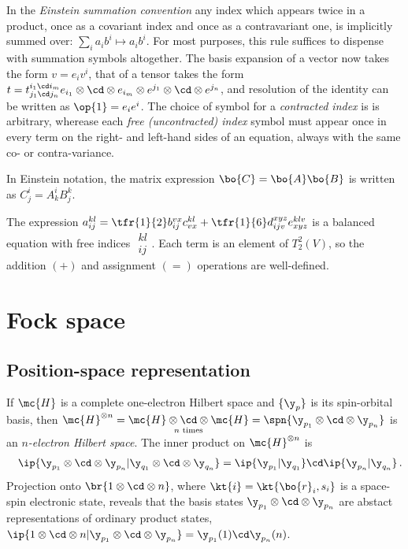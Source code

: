 \documentclass[11pt,fleqn]{article}
\numberwithin{equation}{section}
\begin{document}
\begin{ntt}\label{einstein-summation}
In the \textit{Einstein summation convention} any index which appears twice in a product, once as a covariant index and once as a contravariant one, is implicitly summed over: $\sum_i a_i b^i\mapsto a_ib^i$.
For most purposes, this rule suffices to dispense with summation symbols altogether.
The basis expansion of a vector now takes the form $v=e_iv^i$, that of a tensor takes the form $t = t_{j_1\cd j_n}^{i_1\cd i_m}e_{i_1}\otimes\cd\otimes e_{i_m}\otimes e^{j_1}\otimes\cd\otimes e^{j_n}$, and resolution of the identity can be written as $\op{1}=e_ie^i$.
The choice of symbol for a \textit{contracted index} is is arbitrary, wherease each \textit{free \emph{(uncontracted)} index} symbol must appear once in every term on the right- and left-hand sides of an equation, always with the same co- or contra-variance.
\end{ntt}

\begin{ex}
In Einstein notation, the matrix expression $\bo{C}=\bo{A}\bo{B}$ is written as $C^i_j=A^i_kB^k_j$.
\end{ex}

\begin{ex}
The expression
$a_{ij}^{kl}=\tfr{1}{2}b_{ij}^{vx}c_{vx}^{kl}+\tfr{1}{6}d_{ijv}^{xyz}e_{xyz}^{klv}$ is a balanced equation with free indices $\substack{kl\\ij}$.
Each term is an element of $T_2^2(V)$, so the addition $(+)$ and assignment $(=)$ operations are well-defined.
\end{ex}



\newpage
\section{Fock space}

\subsection{Position-space representation}

\begin{dfn}
If $\mc{H}$ is a complete one-electron Hilbert space and $\{\y_p\}$ is its spin-orbital basis, then $\mc{H}^{\otimes n}=\underset{\text{$n$ times}}{\mc{H}\otimes\cd\otimes\mc{H}}=\spn\{\y_{p_1}\otimes\cd\otimes\y_{p_n}\}$ is an \textit{$n$-electron Hilbert space}.
The inner product on $\mc{H}^{\otimes n}$ is
\begin{align}
&&
  \ip{\y_{p_1}\otimes\cd\otimes\y_{p_n}|\y_{q_1}\otimes\cd\otimes\y_{q_n}}
=
  \ip{\y_{p_1}|\y_{q_1}}\cd\ip{\y_{p_n}|\y_{q_n}}\,.
\end{align}
Projection onto $\br{1\otimes\cd\otimes n}$, where $\kt{i}=\kt{\bo{r}_i,s_i}$ is a space-spin electronic state, reveals that the basis states $\y_{p_1}\otimes\cd\otimes\y_{p_n}$ are abstact representations of ordinary product states, $\ip{1\otimes\cd\otimes n|\y_{p_1}\otimes\cd\otimes\y_{p_n}}=\y_{p_1}(1)\cd\y_{p_n}(n)$.
\end{dfn}
\end{document}
